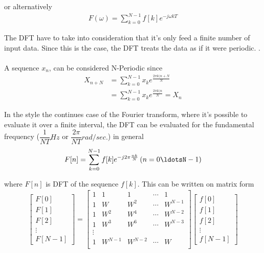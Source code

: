 or alternatively
\begin{align*}
	F(\omega) = \sum_{k=0}^{N-1}f[k]e^{-j\omega k T}
\end{align*} 


The DFT have to take into consideration that it's only feed a finite number of input data. Since this is the case, the DFT treats the data as if it were periodic.
.
\\\\
A sequence $x_n$, can be considered N-Periodic since 
\begin{align*}
	X_{n+N} 
	&= \sum_{k=0}^{N-1}x_k e^{\frac{2 \pi k (n+N}{N}}\\
	&= \sum_{k=0}^{N-1}x_k e^{\frac{2 \pi k (n}{N}} = X_n
\end{align*} 

In the style the continues case of the Fourier transform, where it's possible to evaluate it over a finite interval, the DFT can be evaluated for the fundamental frequency ($\dfrac{1}{NT} Hz$ or $\dfrac{2\pi}{NT}rad/sec.$) in general
\begin{align*}
	F[n] = \sum_{k=0}^{N-1}f[k]e^{-j2\pi\frac{nk}{N}} \, (n = 0\ldotsN-1)
\end{align*}

where $F[n]$ is DFT of the sequence $f[k]$.
This can be written on matrix form
\begin{align*}
	\begin{bmatrix}
		F[0]\\ F[1]\\ F[2]\\ \vdots \\ F[N-1]
	\end{bmatrix}
	=
	\begin{bmatrix}
		1 & 1 	& 1   	& \cdots & 1\\
		1 & W 	& W^2 	& \cdots & W^{N-1}\\
		1 & W^2	& W^4	& \cdots & W^{N-2}\\
		1 & W^3	& W^6	& \cdots & W^{N-3}\\
		\vdots\\
		1 & W^{N-1}	& W^{N-2}	& \cdots & W\\
	\end{bmatrix}
	\begin{bmatrix}
		f[0]\\ f[1]\\ f[2]\\ \vdots \\ f[N-1]
	\end{bmatrix}
\end{align*}

